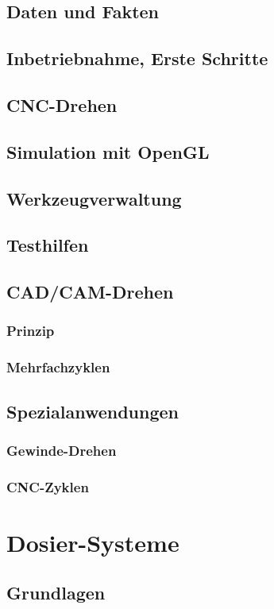 \documentclass[a4paper]{book}
\begin{document}
	\section{Daten und Fakten} 
	\section{Inbetriebnahme, Erste Schritte} 
	\section{CNC-Drehen} 
	\section{Simulation mit OpenGL} 
	\section{Werkzeugverwaltung} 
	\section{Testhilfen} 
	\section{CAD/CAM-Drehen} 
		\subsection{Prinzip} 
		\subsection{Mehrfachzyklen} 
	\section{Spezialanwendungen} 
		\subsection{Gewinde-Drehen} 
		\subsection{CNC-Zyklen} 
 
\chapter{Dosier-Systeme}
	\section{Grundlagen} 
\end{document}
